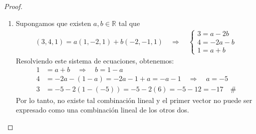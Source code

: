 \documentclass[11pt,letterpaper]{article}
\newcommand{\R}{\mathbb{R}}
\begin{document}
\begin{proof}
\begin{enumerate}
    \item Supongamos que existen $a,b\in \R$ tal que
    \begin{align*}
        (3,4,1)=a(1,-2,1)+b(-2,-1,1) \quad \Rightarrow \quad
        \begin{cases}
            3=a-2b \\
            4=-2a-b \\
            1=a+b
        \end{cases}
    \end{align*}
    Resolviendo este sistema de ecuaciones, obtenemos:
    \begin{align*}
        1 &= a + b \quad \Rightarrow \quad b = 1 - a \\
        4 &= -2a - (1 - a) = -2a - 1 + a = -a - 1 \quad \Rightarrow \quad a = -5 \\
        3 &= -5 - 2(1 - (-5)) = -5 - 2(6) = -5 - 12 = -17 \quad \#
    \end{align*}
    Por lo tanto, no existe tal combinación lineal y el primer vector no puede ser expresado como una combinación lineal de los otros dos.
    \end{enumerate}
\end{proof}
\end{document}
